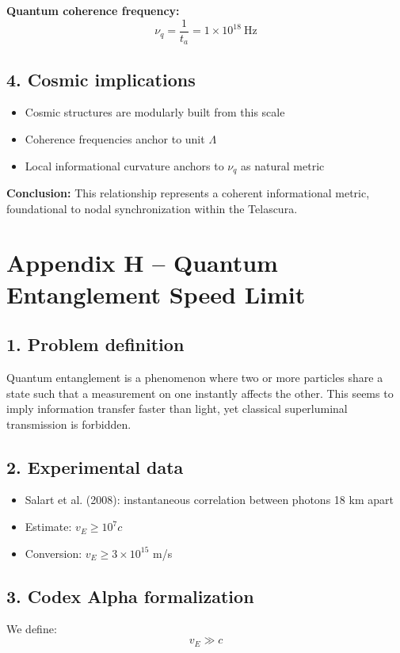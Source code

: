 \documentclass[12pt]{article}
\begin{document}
\textbf{Quantum coherence frequency:}
\begin{equation}
    \nu_q = \frac{1}{t_a} = 1 \times 10^{18}~\text{Hz}
\end{equation}

\subsection*{4. Cosmic implications}
\begin{itemize}
    \item Cosmic structures are modularly built from this scale
    \item Coherence frequencies anchor to unit $\Lambda$
    \item Local informational curvature anchors to $\nu_q$ as natural metric
\end{itemize}

\textbf{Conclusion:} This relationship represents a coherent informational metric, foundational to nodal synchronization within the Telascura.
\section*{Appendix H – Quantum Entanglement Speed Limit}

\subsection*{1. Problem definition}
Quantum entanglement is a phenomenon where two or more particles share a state such that a measurement on one instantly affects the other. This seems to imply information transfer faster than light, yet classical superluminal transmission is forbidden.

\subsection*{2. Experimental data}
\begin{itemize}
    \item Salart et al. (2008): instantaneous correlation between photons 18 km apart
    \item Estimate: $v_E \geq 10^7 c$
    \item Conversion: $v_E \geq 3 \times 10^{15}$ m/s
\end{itemize}

\subsection*{3. Codex Alpha formalization}
We define:
\begin{equation}
    v_E \gg c
\end{equation}
\end{document}
